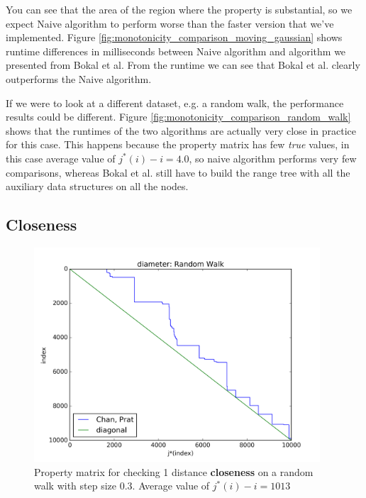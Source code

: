 \documentclass{article}
\begin{document}
You can see that the area of the region where the property is
substantial, so we expect Naive algorithm to perform worse than the
faster version that we've implemented.  Figure
\ref{fig:monotonicity_comparison_moving_gaussian} shows runtime
differences in milliseconds between Naive algorithm and algorithm
we presented from Bokal et al. From the runtime we can see that
Bokal et al. clearly outperforms the Naive algorithm.

If we were to look at a different dataset, e.g. a random walk, the
performance results could be different. Figure
\ref{fig:monotonicity_comparison_random_walk} shows that the runtimes
of the two algorithms are actually very close in practice for this
case. This happens because the property matrix has few \textit{true}
values, in this case average value of $j^*(i) - i = 4.0$, so naive
algorithm performs very few comparisons, whereas Bokal et al. still
have to build the range tree with all the auxiliary data structures
on all the nodes.


\subsection{Closeness}
\label{sec:experiments:closeness}


\begin{figure}[!ht]
  \centering
  \includegraphics[height=8cm]{../plots/diameter_random_walk}
  \caption{Property matrix for checking 1 distance \textbf{closeness}
  on a random walk with step size 0.3. Average value of $j^*(i) - i = 1013$}
  \label{fig:diameter_demo}
\end{figure}
\end{document}
